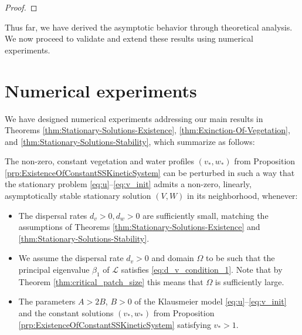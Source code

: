 \documentclass[11pt, a4paper]{article}
\theoremstyle{break}
\theoremstyle{break}
\theoremstyle{break}
\theoremstyle{break}
\theoremstyle{break}
\theoremstyle{break}
\theoremstyle{break}
\theoremstyle{break}
\theoremstyle{break}
\theoremstyle{break}
\begin{document}
\begin{proof}
\end{proof}

Thus far, we have derived the asymptotic behavior through theoretical analysis. We now proceed to validate and extend these results using numerical experiments.

\section{Numerical experiments}
We have designed numerical experiments addressing our main results in Theorems \ref{thm:Stationary-Solutions-Existence}, \ref{thm:Exinction-Of-Vegetation}, and \ref{thm:Stationary-Solutions-Stability}, which summarize as follows: 

The non-zero, constant vegetation and water profiles $(v_*, w_*)$ from Proposition \ref{prp:ExistenceOfConstantSSKineticSystem} can be perturbed in such a way that the stationary problem \eqref{eq:u}--\eqref{eq:v_init} admits a non-zero, linearly, asymptotically stable stationary solution $(V, W)$ in its neighborhood, whenever: 
\begin{itemize}
    \item[(A1)] The dispersal rates $d_v > 0, d_w > 0$ are sufficiently small, matching the assumptions of Theorems \ref{thm:Stationary-Solutions-Existence} and \ref{thm:Stationary-Solutions-Stability}.
    \item[(A2)] We assume the dispersal rate $d_v > 0$ and domain $\Omega$ to be such that the principal eigenvalue $\beta_1$ of $\mathcal{L}$ satisfies \eqref{eq:d_v_condition_1}. Note that by Theorem \ref{thm:critical_patch_size} this means that $\Omega$ is sufficiently large.
    \item[(A3)] The parameters $A > 2B$, $B > 0$ of the Klausmeier model \eqref{eq:u}--\eqref{eq:v_init} and the constant solutions $(v_*, w_*)$ from Proposition \ref{prp:ExistenceOfConstantSSKineticSystem} satisfying $v_* > 1$.
\end{itemize}
\end{document}
